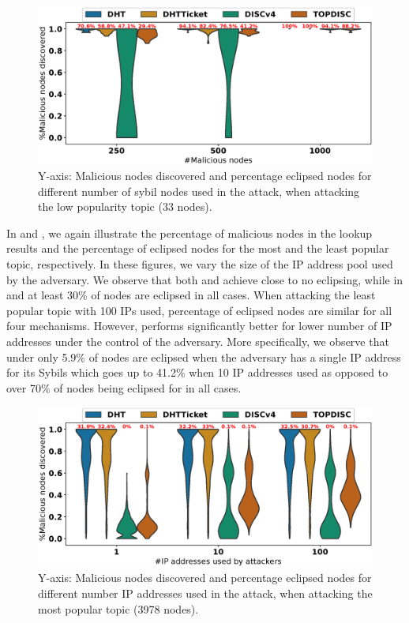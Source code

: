 \begin{figure}[!h]
\includegraphics[width=\linewidth]{results/security/violin_percentEvil_percentageMaliciousDiscovered_t299.eps}
\caption{Y-axis: Malicious nodes discovered and percentage eclipsed nodes for different number of sybil nodes used in the attack,  when attacking the low popularity topic (33 nodes).}
\label{fig:eclipse_evil_t299}
\end{figure}

In  and , we again illustrate the percentage of malicious nodes in the lookup results and the percentage of eclipsed nodes for the most and the least popular topic, respectively. In these figures, we vary the size of the IP address pool used by the adversary. We observe that both \sysname and \discv achieve close to no eclipsing, while in \altname and \altnameticket at least 30\% of nodes are eclipsed in all cases.
When attacking the least popular topic with 100 IPs used, percentage of eclipsed nodes are similar for all four mechanisms. However, \sysname performs significantly better for lower number of IP addresses under the control of the adversary.
More specifically, we observe that under \sysname only 5.9\% of nodes are eclipsed when the adversary has a single IP address for its Sybils which goes up to 41.2\% when 10 IP addresses used as opposed to over 70\% of nodes being eclipsed for \discv in all cases.  

\begin{figure}[!h]
\includegraphics[width=\linewidth]{results/security/violin_sybilSize_percentageMaliciousDiscovered_t0.eps}
\caption{Y-axis: Malicious nodes discovered and percentage eclipsed nodes for different number IP addresses used in the attack,  when attacking the most popular topic (3978 nodes).}
\label{fig:eclipse_sybil_t0}
\end{figure}



